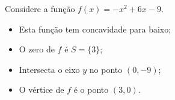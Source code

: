 \begin{exem}
 Considere a função $f(x)= -x^2+6x-9$.

 \begin{itemize}
    \item Esta função tem concavidade para baixo;
    \item O zero de $f$ é $S= \{3\}$;
    \item Intersecta o eixo $y$ no ponto $(0,-9)$;
    \item O vértice de $f$ é o ponto $(3, 0)$.
\end{itemize}

\begin{center}
\end{center}
\end{exem}

